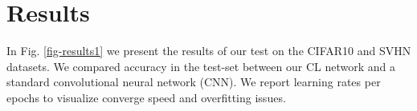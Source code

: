 \documentclass{article} %
\begin{document}





\section{Results}
\label{sec-results}

In Fig. \ref{fig-results1} we present the results of our test on the CIFAR10 and SVHN datasets. We compared accuracy in the test-set between our CL network and a standard convolutional neural network (CNN). We report learning rates per epochs to visualize converge speed and overfitting issues.
\end{document}
